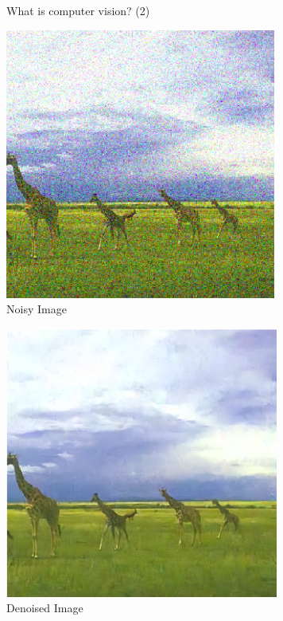 \documentclass[default, aspectratio=169]{beamer}
\begin{document}
	\begin{frame}{What is computer vision? (2)}
		\centering
		\begin{minipage}{0.45\textwidth}
			\centering
			\includegraphics[width=\textwidth, keepaspectratio]{pic/noisy_image.png}
			\\Noisy Image
		\end{minipage}%
		\hspace{0.05\textwidth} %
		\begin{minipage}{0.45\textwidth}
			\centering
			\includegraphics[width=\textwidth, keepaspectratio]{pic/denoised_image.png}
			\\Denoised Image
		\end{minipage}
	\end{frame}
\end{document}
